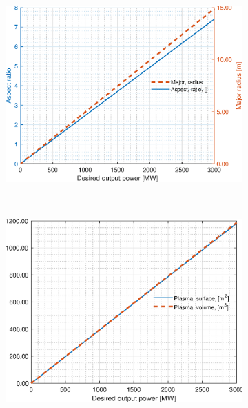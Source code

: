 \begin{figure}[H]
	\begin{subfigure}[h!]{.45\textwidth}
		\includegraphics[width=\textwidth]{MatlabFigures/PE/f3.eps}
	\end{subfigure}
	~
	\begin{subfigure}[h!]{.45\textwidth}
		\includegraphics[width=\textwidth]{MatlabFigures/PE/f4.eps}
	\end{subfigure}


\end{figure}
